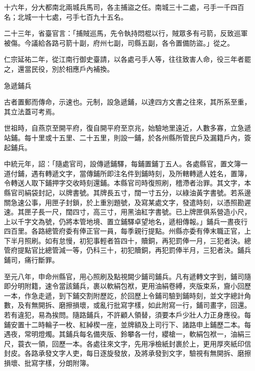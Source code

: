 \begin{pinyinscope}
 十六年，分大都南北兩城兵馬司，各主捕盜之任。南城三十二處，弓手一千四百名；北城一十七處，弓手七百九十五名。



 二十三年，省臺官言：「捕賊巡馬，先令執持悶棍以行，賊眾多有弓箭，反致巡軍被傷。今議給各路弓箭十副，府州七副，司縣五副，各令置備防盜。」從之。



 仁宗延祐二年，從江南行御史臺請，以各處弓手人等，往往致害人命，役三年者罷之，還當民役，別於相應戶內補換。



 急遞鋪兵



 古者置郵而傳命，示速也。元制，設急遞鋪，以達四方文書之往來，其所系至重，其立法蓋可考焉。



 世祖時，自燕京至開平府，復自開平府至京兆，始驗地里遠近，人數多寡，立急遞站鋪。每十里或十五里、二十五里，則設一鋪，於各州縣所管民戶及漏籍戶內，簽起鋪兵。



 中統元年，詔：「隨處官司，設傳遞鋪驛，每鋪置鋪丁五人。各處縣官，置文簿一道付鋪，遇有轉遞文字，當傳鋪所即注名件到鋪時刻，及所轄轉遞人姓名，置簿，令轉送人取下鋪押字交收時刻還鋪。本縣官司時復照刷，稽滯者治罪。其文字，本縣官司絹袋封記，以牌書號。其牌長五寸，闊一寸五分，以綠油黃字書號。若系邊關急速公事，用匣子封鎖，於上重別題號，及寫某處文字，發遣時刻，以憑照勘遲速。其匣子長一尺，闊四寸，高三寸，用黑油紅字書號。已上牌匣俱系營造小尺，上以千字文為號，仍將本管地境、置立鋪驛卓望地名，遞相傳報。」鋪兵一晝夜行四百里。各路總管府委有俸正官一員，每季親行提點。州縣亦委有俸末職正官，上下半月照刷。如有怠慢，初犯事輕者笞四十，贖銅，再犯罰俸一月，三犯者決。總管府提點官比總管減一等，仍科三十，初犯贖銅，再犯罰俸半月，三犯者決。鋪兵鋪司，痛行斷罪。



 至元八年，申命州縣官，用心照刷及點視闕少鋪司鋪兵。凡有遞轉文字到，鋪司隨即分明附籍，速令當該鋪兵，裹以軟絹包袱，更用油絹卷縛，夾版束系，齎小回歷一本，作急走遞，到下鋪交割附歷訖，於回歷上令鋪司驗到鋪時刻，並文字總計角數，及有無開拆、磨擦損壞，或亂行批寫字樣，如此附寫一行，鋪司畫字，回還。若有違犯，易為挨問。隨路鋪兵，不許顧人領替，須要本戶少壯人力正身應役。每鋪安置十二時輪子一枚、紅綽楔一座，並牌額及上司行下、諸路申上鋪歷二本。每遇夜，常明燈燭。其鋪兵每名備夾版、鈴攀各一付，纓槍一，軟絹包袱一，油絹三尺，蓑衣一領，回歷一本。各處往來文字，先用凈檢紙封裹於上，更用厚夾紙印信封皮。各路承發文字人吏，每日逐旋發放，及將承發到文字，驗視有無開拆、磨擦損壞、批寫字樣，分朗附簿。




\end{pinyinscope}
